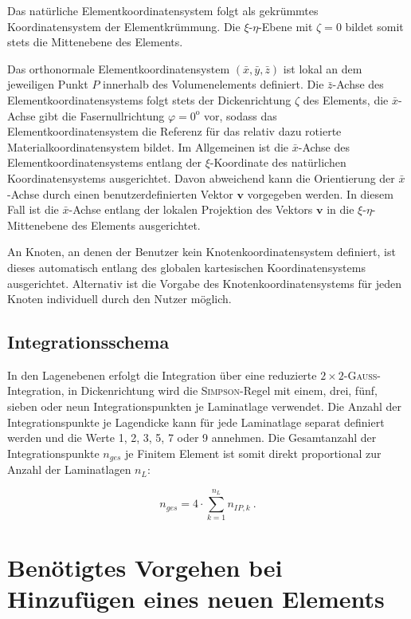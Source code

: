 \documentclass[11pt,titlepage,listof=totoc,bibliography=totoc,twoside]{scrreprt}
\begin{document}
{{Das natürliche Elementkoordinatensystem folgt als gekrümmtes Koordinatensystem der Elementkrümmung. Die $\xi$-$\eta$-Ebene mit $\zeta=0$ bildet somit stets die Mittenebene des Elements. \par
Das orthonormale Elementkoordinatensystem $\left( \bar{x}, \bar{y}, \bar{z} \right)$ ist lokal an dem jeweiligen Punkt $P$ innerhalb des Volumenelements definiert. Die $\bar{z}$-Achse des Elementkoordinatensystems folgt stets der Dickenrichtung $\zeta$ des Elements, die $\bar{x}$-Achse gibt die Fasernullrichtung $\varphi=0^\text{o}$ vor, sodass das Elementkoordinatensystem die Referenz für das relativ dazu rotierte Materialkoordinatensystem bildet. Im Allgemeinen ist die $\bar{x}$-Achse des Elementkoordinatensystems entlang der $\xi$-Koordinate des natürlichen Koordinatensystems ausgerichtet. Davon abweichend kann die Orientierung der $\bar{x}$-Achse durch einen benutzerdefinierten Vektor $\mathbf{v}$ vorgegeben werden. In diesem Fall ist die $\bar{x}$-Achse entlang der lokalen Projektion des Vektors $\mathbf{v}$ in die $\xi$-$\eta$-Mittenebene des Elements ausgerichtet. \par
An Knoten, an denen der Benutzer kein Knotenkoordinatensystem definiert, ist dieses automatisch entlang des globalen kartesischen Koordinatensystems ausgerichtet. Alternativ ist die Vorgabe des Knotenkoordinatensystems für jeden Knoten individuell durch den Nutzer möglich.

\subsection{Integrationsschema}

In den Lagenebenen erfolgt die Integration über eine reduzierte $2 \! \times \! 2$-\textsc{Gauss}-Integration, in Dickenrichtung wird die \textsc{Simpson}-Regel mit einem, drei, fünf, sieben oder neun Integrationspunkten je Laminatlage verwendet. Die Anzahl der Integrationspunkte je Lagendicke kann für jede Laminatlage separat definiert werden und die Werte 1, 2, 3, 5, 7 oder 9 annehmen. Die Gesamtanzahl der Integrationspunkte $n_{ges}$ je Finitem Element ist somit direkt proportional zur Anzahl der Laminatlagen $n_L$:

\begin{equation}
\label{eq:n_ip_ges}
  n_{ges} = 4 \cdot \sum_{k=1}^{n_L} n_{IP,k} \ .
\end{equation}

\newpage



\section{Benötigtes Vorgehen bei Hinzufügen eines neuen Elements}

}}
\end{document}
